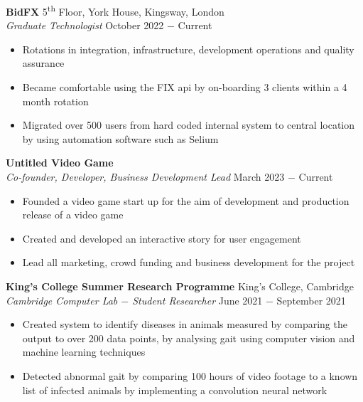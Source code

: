 \documentclass[8pt]{article}
\begin{document}
\textbf{BidFX} \hfill 5\textsuperscript{th} Floor, York House, Kingsway, London\\
\textit{Graduate Technologist} \hfill October 2022 $-$ Current
\begin{itemize}
    \item Rotations in integration, infrastructure, development operations and quality assurance
    \item Became comfortable using the FIX api by on-boarding 3 clients within a 4 month rotation
    \item Migrated over 500 users from hard coded internal system to central location by using automation software such as Selium
\end{itemize} \medskip

\textbf{Untitled Video Game}\\
\textit{Co-founder, Developer, Business Development Lead} \hfill March 2023 $-$ Current
\begin{itemize}
    \item Founded a video game start up for the aim of development and production release of a video game
    \item Created and developed an interactive story for user engagement
    \item Lead all marketing, crowd funding and business development for the project
\end{itemize} \medskip

\textbf{King's College Summer Research Programme} \hfill King's College, Cambridge \\
\textit{Cambridge Computer Lab $-$ Student Researcher} \hfill June 2021 $-$ September 2021
\begin{itemize}
    \item Created system to identify diseases in animals measured by comparing the output to over 200 data points, by analysing gait using computer vision and machine learning techniques
    \item Detected abnormal gait by comparing 100 hours of video footage to a known list of infected animals by implementing a convolution neural network 
\end{itemize} \medskip
\end{document}
